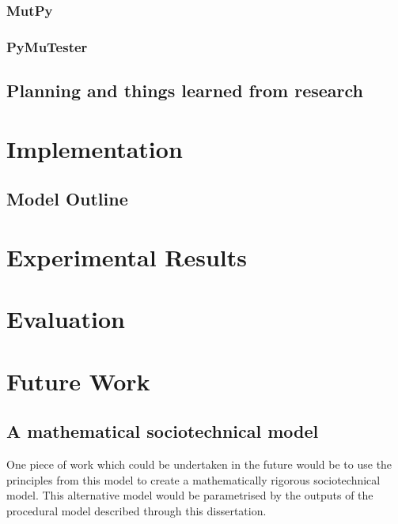 \documentclass[a4paper]{l4proj}
\begin{document}
\begin{itemize}
\subsection{MutPy}
\label{fuzzing_mutpy}

\subsection{PyMuTester}
\label{fuzzing_pymutester}

\section{Planning and things learned from research}  %
\label{planning_head}

\chapter{Implementation}
\label{implementation_head}

\section{Model Outline}
\label{model_outline}



\chapter{Experimental Results}
\label{experimental_results}


\chapter{Evaluation}
\label{evaluation}

\chapter{Future Work}
\label{semantics}
\section{A mathematical sociotechnical model}
One piece of work which could be undertaken in the future would be to use the principles from this model to create a mathematically rigorous sociotechnical model. This alternative model would be parametrised by the outputs of the procedural model described through this dissertation. 

\end{itemize}
\end{document}
